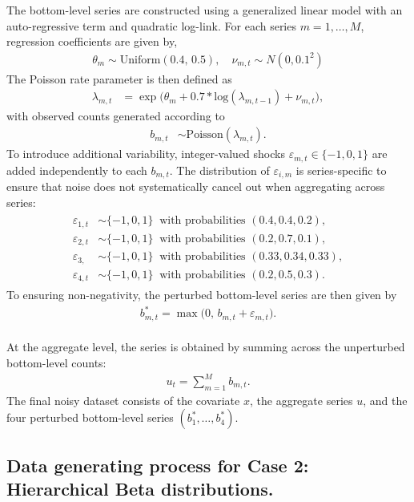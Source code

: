 The bottom-level series are constructed using a generalized linear model with an auto-regressive term and quadratic log-link. For each series \(m=1,\dots,M\), regression coefficients are given by,
\begin{align*}
\theta_{m} \sim \text{Uniform}(0.4,\,0.5), \quad \nu_{m,t} \sim N(0, 0.1^2)
\end{align*}
The Poisson rate parameter is then defined as
\begin{align*}
\lambda_{m,t} &= \exp\!\big( \theta_{m} + 0.7*\text{log}(\lambda_{m,t-1}) + \nu_{m,t} \big),
\end{align*}
with observed counts generated according to
\begin{align*}
b_{m,t} &\sim \text{Poisson}(\lambda_{m,t}).
\end{align*}
To introduce additional variability, integer-valued shocks
\(\varepsilon_{m,t} \in \{-1,0,1\}\) are added independently to each \(b_{m,t}\).
The distribution of \(\varepsilon_{i,m}\) is series-specific to ensure that noise does not systematically cancel out when aggregating across series:
\begin{align*}
\begin{aligned}
\varepsilon_{1,t} &\sim \{-1,0,1\} \;\; \text{with probabilities } (0.4, 0.4, 0.2), \\
\varepsilon_{2,t} &\sim \{-1,0,1\} \;\; \text{with probabilities } (0.2, 0.7, 0.1), \\
\varepsilon_{3,} &\sim \{-1,0,1\} \;\; \text{with probabilities } (0.33, 0.34, 0.33), \\
\varepsilon_{4,t} &\sim \{-1,0,1\} \;\; \text{with probabilities } (0.2, 0.5, 0.3).
\end{aligned}
\end{align*}
To ensuring non-negativity, the perturbed bottom-level series are then given by
\begin{align*}
b^{*}_{m,t} = \max\!\big(0,\, b_{m,t} + \varepsilon_{m,t}\big).
\end{align*}\\
At the aggregate level, the series is obtained by summing across the unperturbed bottom-level counts:
\begin{align*}
u_t  = \sum_{m=1}^M b_{m,t}.
\end{align*}
The final noisy dataset consists of the covariate \(x\), the aggregate series \(u\), and the four perturbed bottom-level series \((b^{\ast}_{1},\dots,b^{\ast}_{4})\).

\subsection{Data generating process for Case 2: Hierarchical Beta distributions.}\label{data-generating-process-for-case-2-hierarchical-beta-distributions.}

